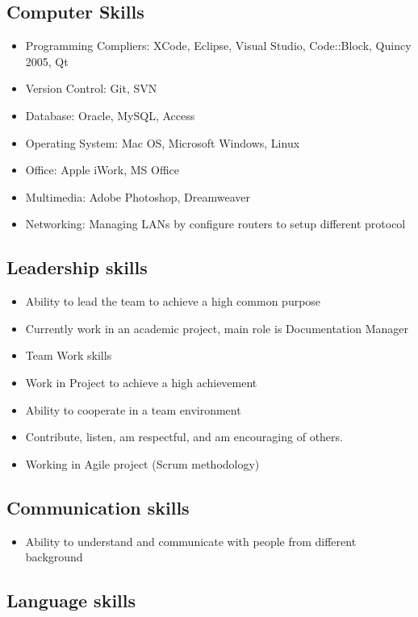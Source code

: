 \documentclass{article}
\begin{document}
\subsection*{Computer Skills}
	\begin{itemize}
	\item Programming Compliers: XCode, Eclipse, Visual Studio, Code::Block, Quincy 2005, Qt
	\item Version Control: Git, SVN
	\item Database: Oracle, MySQL, Access
	\item Operating System: Mac OS, Microsoft Windows, Linux
	\item Office: Apple iWork, MS Office
	\item Multimedia: Adobe Photoshop, Dreamweaver
	\item Networking: Managing LANs by configure routers to setup different protocol
	\end{itemize}

\subsection*{Leadership skills}
	
	\begin{itemize}
	\item Ability to lead the team to achieve a high common purpose
	\item Currently work in an academic project, main role is Documentation Manager
	\item Team Work skills
	\item Work in Project to achieve a high achievement
	\item Ability to cooperate in a team environment
	\item Contribute, listen, am respectful, and am encouraging of others.
	\item Working in Agile project (Scrum methodology)
	\end{itemize}
	
\subsection*{Communication skills}
	
	\begin{itemize}
	\item Ability to understand and communicate with people from different background
	\end{itemize}
	
\subsection*{Language skills}
\end{document}
